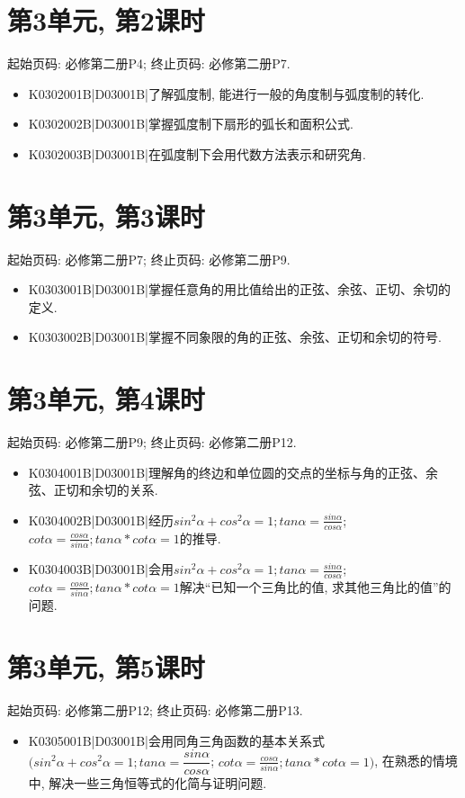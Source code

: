 \section*{第3单元, 第2课时}
起始页码: 必修第二册P4; 终止页码: 必修第二册P7.
\begin{itemize}
\item K0302001B|D03001B|了解弧度制, 能进行一般的角度制与弧度制的转化.
\item K0302002B|D03001B|掌握弧度制下扇形的弧长和面积公式.
\item K0302003B|D03001B|在弧度制下会用代数方法表示和研究角.
\end{itemize}

\section*{第3单元, 第3课时}
起始页码: 必修第二册P7; 终止页码: 必修第二册P9.
\begin{itemize}
\item K0303001B|D03001B|掌握任意角的用比值给出的正弦、余弦、正切、余切的定义.
\item K0303002B|D03001B|掌握不同象限的角的正弦、余弦、正切和余切的符号.
\end{itemize}

\section*{第3单元, 第4课时}
起始页码: 必修第二册P9; 终止页码: 必修第二册P12.
\begin{itemize}
\item K0304001B|D03001B|理解角的终边和单位圆的交点的坐标与角的正弦、余弦、正切和余切的关系.
\item K0304002B|D03001B|经历$sin^2\alpha+cos^2\alpha=1;tan\alpha=\frac{sin\alpha}{cos\alpha}$; $cot\alpha=\frac{cos\alpha}{sin\alpha};tan\alpha*cot\alpha=1$的推导.
\item K0304003B|D03001B|会用$sin^2\alpha+cos^2\alpha=1;tan\alpha=\frac{sin\alpha}{cos\alpha}$; $cot\alpha=\frac{cos\alpha}{sin\alpha};tan\alpha*cot\alpha=1$解决``已知一个三角比的值, 求其他三角比的值''的问题.
\end{itemize}

\section*{第3单元, 第5课时}
起始页码: 必修第二册P12; 终止页码: 必修第二册P13.
\begin{itemize}
\item K0305001B|D03001B|会用同角三角函数的基本关系式$(sin^2\alpha+cos^2\alpha=1;tan\alpha=\dfrac{sin\alpha}{cos\alpha}$; $cot\alpha=\frac{cos\alpha}{sin\alpha};tan\alpha*cot\alpha=1)$, 在熟悉的情境中, 解决一些三角恒等式的化简与证明问题.
\end{itemize}

